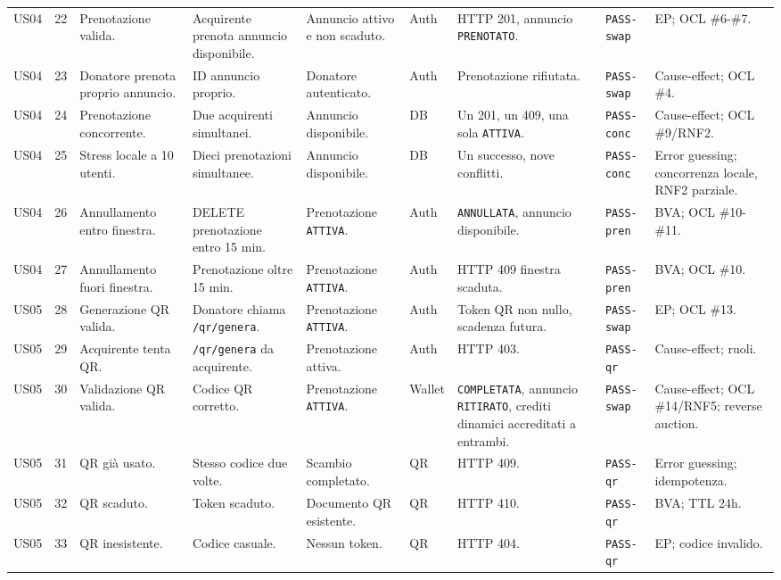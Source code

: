 \documentclass[11pt,a4paper]{article}
\newcommand{\code}[1]{\texttt{#1}}
\begin{document}
\begin{longtable}{L{1.2cm}C{0.45cm}L{2.35cm}L{2.05cm}L{1.95cm}L{0.9cm}L{2.3cm}L{1.55cm}L{2.05cm}}
US04 & 22 & Prenotazione valida. & Acquirente prenota annuncio disponibile. & Annuncio attivo e non scaduto. & Auth & HTTP 201, annuncio \code{PRENOTATO}. & \code{PASS-swap} & EP; OCL \#6-\#7. \\
US04 & 23 & Donatore prenota proprio annuncio. & ID annuncio proprio. & Donatore autenticato. & Auth & Prenotazione rifiutata. & \code{PASS-swap} & Cause-effect; OCL \#4. \\
US04 & 24 & Prenotazione concorrente. & Due acquirenti simultanei. & Annuncio disponibile. & DB & Un 201, un 409, una sola \code{ATTIVA}. & \code{PASS-conc} & Cause-effect; OCL \#9/RNF2. \\
US04 & 25 & Stress locale a 10 utenti. & Dieci prenotazioni simultanee. & Annuncio disponibile. & DB & Un successo, nove conflitti. & \code{PASS-conc} & Error guessing; concorrenza locale, RNF2 parziale. \\
US04 & 26 & Annullamento entro finestra. & DELETE prenotazione entro 15 min. & Prenotazione \code{ATTIVA}. & Auth & \code{ANNULLATA}, annuncio disponibile. & \code{PASS-pren} & BVA; OCL \#10-\#11. \\
US04 & 27 & Annullamento fuori finestra. & Prenotazione oltre 15 min. & Prenotazione \code{ATTIVA}. & Auth & HTTP 409 finestra scaduta. & \code{PASS-pren} & BVA; OCL \#10. \\

US05 & 28 & Generazione QR valida. & Donatore chiama \code{/qr/genera}. & Prenotazione \code{ATTIVA}. & Auth & Token QR non nullo, scadenza futura. & \code{PASS-swap} & EP; OCL \#13. \\
US05 & 29 & Acquirente tenta QR. & \code{/qr/genera} da acquirente. & Prenotazione attiva. & Auth & HTTP 403. & \code{PASS-qr} & Cause-effect; ruoli. \\
US05 & 30 & Validazione QR valida. & Codice QR corretto. & Prenotazione \code{ATTIVA}. & Wallet & \code{COMPLETATA}, annuncio \code{RITIRATO}, crediti dinamici accreditati a entrambi. & \code{PASS-swap} & Cause-effect; OCL \#14/RNF5; reverse auction. \\
US05 & 31 & QR già usato. & Stesso codice due volte. & Scambio completato. & QR & HTTP 409. & \code{PASS-qr} & Error guessing; idempotenza. \\
US05 & 32 & QR scaduto. & Token scaduto. & Documento QR esistente. & QR & HTTP 410. & \code{PASS-qr} & BVA; TTL 24h. \\
US05 & 33 & QR inesistente. & Codice casuale. & Nessun token. & QR & HTTP 404. & \code{PASS-qr} & EP; codice invalido. \\


\end{longtable}
\end{document}
